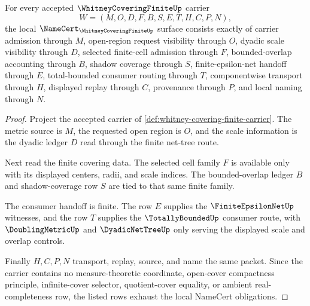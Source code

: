 \begin{theorem}
\label{thm:whitney-covering-finite-namecert-obligations}
For every accepted $\WhitneyCoveringFiniteUp$ carrier
$$
W=(M,O,D,F,B,S,E,T,H,C,P,N),
$$
the local $\NameCert_{\WhitneyCoveringFiniteUp}$ surface consists exactly of carrier admission through $M$, open-region request visibility through $O$, dyadic scale visibility through $D$, selected finite-cell admission through $F$, bounded-overlap accounting through $B$, shadow coverage through $S$, finite-epsilon-net handoff through $E$, total-bounded consumer routing through $T$, componentwise transport through $H$, displayed replay through $C$, provenance through $P$, and local naming through $N$.
\end{theorem}
\begin{proof}
Project the accepted carrier of \autoref{def:whitney-covering-finite-carrier}. The metric source is $M$, the requested open region is $O$, and the scale information is the dyadic ledger $D$ read through the finite net-tree route.

Next read the finite covering data. The selected cell family $F$ is available only with its displayed centers, radii, and scale indices. The bounded-overlap ledger $B$ and shadow-coverage row $S$ are tied to that same finite family.

The consumer handoff is finite. The row $E$ supplies the $\FiniteEpsilonNetUp$ witnesses, and the row $T$ supplies the $\TotallyBoundedUp$ consumer route, with $\DoublingMetricUp$ and $\DyadicNetTreeUp$ only serving the displayed scale and overlap controls.

Finally $H,C,P,N$ transport, replay, source, and name the same packet. Since the carrier contains no measure-theoretic coordinate, open-cover compactness principle, infinite-cover selector, quotient-cover equality, or ambient real-completeness row, the listed rows exhaust the local NameCert obligations.
\end{proof}



